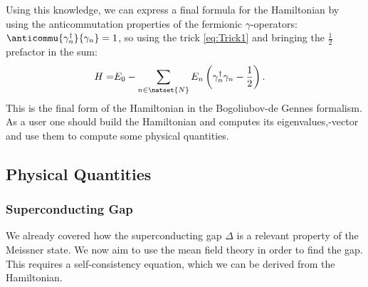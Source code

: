 \documentclass[../main.tex]{subfile}
\begin{document}
Using this knowledge, we can express a final formula for the Hamiltonian by using the anticommutation properties of the fermionic $\gamma$-operators:
 $\anticommu{\gamma^{\dagger}_n}{\gamma_{n}} = 1$, so using the trick \ref{eq:Trick1} and bringing the $\frac{1}{2}$ prefactor in the sum:
\begin{align}
    H =& E_0 - \sum_{n\in \natset{N}} E_n \left( \gamma_n^{\dagger}\gamma_n - \frac{1}{2}\right).
\end{align}
This is the final form of the Hamiltonian in the Bogoliubov-de Gennes formalism. As a user one should build the Hamiltonian 
and computes its eigenvalues,-vector and use them to compute some physical quantities.\\
\subsection{Physical Quantities}
\subsubsection{Superconducting Gap}
We already covered how the superconducting gap $\Delta$ is a relevant property of the Meissner state. We now aim to use the  mean field 
theory in order to find the gap. This requires a self-consistency equation, which we can be derived from the Hamiltonian.\\ 
\end{document}
